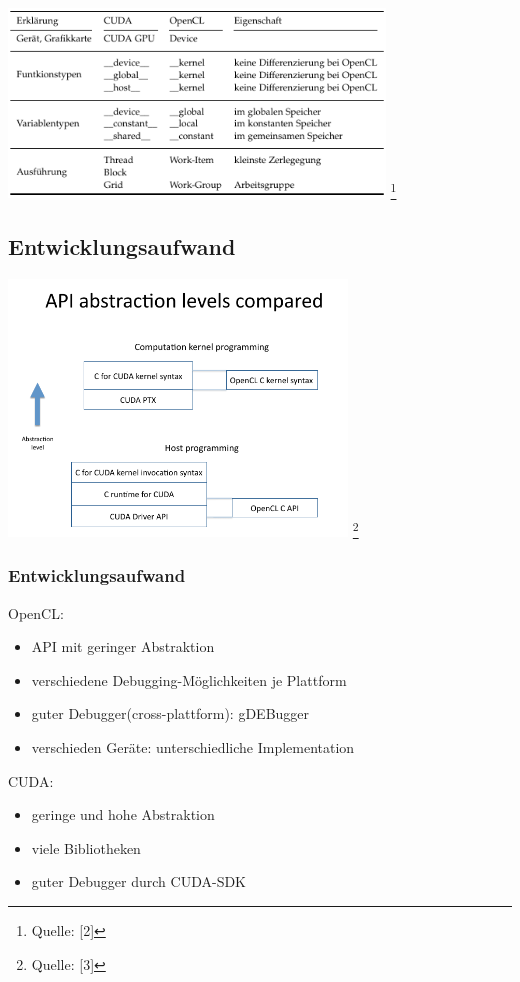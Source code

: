 \documentclass{beamer}
\begin{document}
\begin{frame}
\begin{center}
\includegraphics[width=10cm]{cuda_opencl_begriffe.png}
\footnote{\tiny{Quelle: [2]}}
\end{center}
\end{frame}

\subsection{Entwicklungsaufwand}
\begin{frame}
\begin{center}
\includegraphics[width=9cm]{api_abstraction_level.png}
\footnote{\tiny{Quelle: [3]}}
\end{center}
\end{frame}

\begin{frame}
\frametitle{Entwicklungsaufwand}
OpenCL:
\begin{itemize}
\item API mit geringer Abstraktion
\item verschiedene Debugging-Möglichkeiten je Plattform
\item guter Debugger(cross-plattform): gDEBugger
\item verschieden Geräte: unterschiedliche Implementation
\newline
\end{itemize}
CUDA:
\begin{itemize}
\item geringe und hohe Abstraktion
\item viele Bibliotheken
\item guter Debugger durch CUDA-SDK
\end{itemize}
\end{frame}
\end{document}
